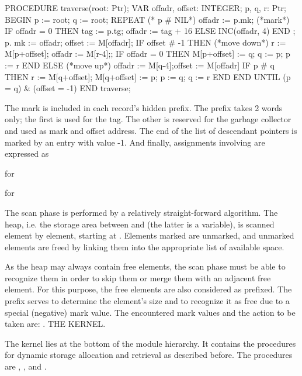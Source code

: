 
\begintt
PROCEDURE traverse(root: Ptr);
  VAR offadr, offset: INTEGER;
  p, q, r: Ptr;
BEGIN p := root; q := root;
  REPEAT (* p # NIL*) offadr := p.mk; (*mark*)
    IF offadr = 0 THEN tag := p.tg; offadr := tag + 16 ELSE INC(offadr, 4) END ;
    p. mk := offadr; offset := M[offadr];
    IF offset # -1 THEN (*move down*)
      r := M[p+offset]; offadr := M[r-4];;
      IF offadr = 0 THEN M[p+offset] := q; q := p; p := r END
    ELSE (*move up*)
      offadr := M[q-4];offset := M[offadr]
      IF p # q THEN r := M[q+offset]; M[q+offset] := p; p := q; q := r END
    END
  UNTIL (p = q) & (offset = -1)
END traverse;
\endtt

\noindent The mark is included in each record's hidden prefix. The prefix takes 2 words only; the first is used for the tag. The other is reserved for the garbage collector and used as mark and offset address. The end of the list of descendant pointers is marked by an entry with value -1. And finally, assignments involving  are expressed as

\item{}  for 
\item{}  for 

The scan phase is performed by a relatively straight-forward algorithm. The heap, i.e. the storage area between  and  (the latter is a variable), is scanned element by element, starting at . Elements marked are unmarked, and unmarked elements are freed by linking them into the appropriate list of available space.

As the heap may always contain free elements, the scan phase must be able to recognize them in order to skip them or merge them with an adjacent free element. For this purpose, the free elements are also considered as prefixed. The prefix serves to determine the element's size and to recognize it as free due to a special (negative) mark value. The encountered mark values and the action to be taken are:
\medskip
{}\medskip
{}. THE KERNEL.

The kernel lies at the bottom of the module hierarchy. It contains the procedures for dynamic storage allocation and retrieval as described before. The procedures are , , and .

